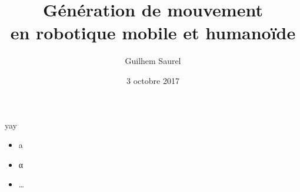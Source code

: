 \documentclass{beamer}
\title{Génération de mouvement \\ en robotique mobile et humanoïde}
\date{3 octobre 2017}
\author{Guilhem Saurel}
\begin{document}
\begin{frame}
    \titlepage
\end{frame}
\begin{frame}{yay}
    \begin{itemize}
        \item a
        \item α
        \item …
    \end{itemize}
\end{frame}
\end{document}
